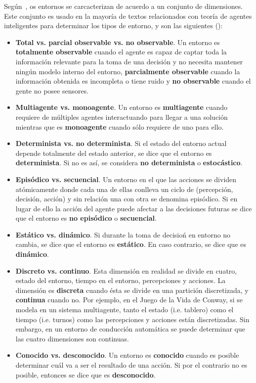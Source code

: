 Según~\cite{russell2003artificial}, os entornos se carcacterizan de acuerdo a un conjunto de dimensiones. Este conjunto es usado en la mayoría de textos relacionados con teoría de agentes inteligentes para determinar los tipos de entorno, y son las siguientes ():

\begin{itemize}
	\item \textbf{Total vs. parcial observable vs. no observable}. Un entorno es \textbf{totalmente observable} cuando el agente es capaz de captar toda la información relevante para la toma de una decisión y no necesita mantener ningún modelo interno del entorno, \textbf{parcialmente observable} cuando la información obtenida es incompleta o tiene ruido y \textbf{no observable} cuando el gente no posee sensores.
	\item \textbf{Multiagente vs. monoagente}. Un entorno es \textbf{multiagente} cuando requiere de múltiples agentes interactuando para llegar a una solución mientras que es \textbf{monoagente} cuando sólo requiere de uno para ello.
	\item \textbf{Determinista vs. no determinista}. Si el estado del entorno actual depende totalmente del estado anterior, se dice que el entorno es \textbf{determinista}. Si no es así, se considera \textbf{no determinista} o \textbf{estocástico}.
	\item \textbf{Episódico vs. secuencial}. Un entorno en el que las acciones se dividen atómicamente donde cada una de ellas conlleva un ciclo de (percepción, decisión, acción) y sin relación una con otra se denomina episódico. Si en lugar de ello la acción del agente puede afectar a las decisiones futuras se dice que el entorno es \textbf{no episódico} o \textbf{secuencial}.
	\item \textbf{Estático vs. dinámico}. Si durante la toma de decisioń en entorno no cambia, se dice que el entorno es \textbf{estático}. En caso contrario, se dice que es \textbf{dinámico}.
	\item \textbf{Discreto vs. continuo}. Esta dimensión en realidad se divide en cuatro, estado del entorno, tiempo en el entorno, percepciones y acciones. La dimensión es \textbf{discreta} cuando ésta se divide en una partición discretizada, y \textbf{continua} cuando no. Por ejemplo, en el Juego de la Vida de Conway, si se modela en un sistema multiagente, tanto el estado (i.e. tablero) como el tiempo (i.e. turnos) como las percepciones y acciones están discretizadas. Sin embargo, en un entorno de conducción automática se puede determinar que las cuatro dimensiones son continuas.
	\item \textbf{Conocido vs. desconocido}. Un entorno es \textbf{conocido} cuando es posible determinar cuál va a ser el resultado de una acción. Si por el contrario no es posible, entonces se dice que es \textbf{desconocido}.
\end{itemize}

